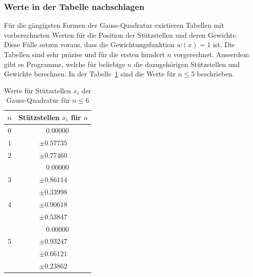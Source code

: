 \subsubsection{Werte in der Tabelle nachschlagen}
Für die gängigsten Formen der Gauss-Quadratur existieren Tabellen mit vorberechneten Werten für die
Position der Stützstellen und deren Gewichte.
Diese Fälle setzen voraus, dass die Gewichtungsfunktion $w(x) = 1$ ist. 
Die Tabellen sind sehr präzise und für die ersten hundert $n$ vorgerechnet.
Ausserdem gibt es Programme, welche für beliebige $n$ die dazugehörigen 
Stützstellen und Gewichte berechnen. 
In der Tabelle~\ref{buch:table:gaussabscissenwerte} sind die Werte für $n \leq 5$ beschrieben.
\begin{table}
    \centering
    \begin{tabular}{|c|c|}
        \hline
        $n$ & Stützstellen $x_{i}$ für $n$ \\
        \hline
        $0$ & $ \phantom{-} 0.00000 $ \\
        \hline
        $1$ & $ \pm 0.57735 $ \\
        \hline
        $2$ & $ \pm 0.77460 $ \\
            & $ \phantom{-} 0.00000 $ \\
        \hline
        $3$ & $ \pm 0.86114 $ \\
            & $ \pm 0.33998 $ \\
        \hline
        $4$ & $ \pm 0.90618 $ \\
            & $ \pm 0.53847 $ \\
            & $ \phantom{-} 0.00000 $ \\
        \hline
        $5$ & $ \pm 0.93247 $ \\
            & $ \pm 0.66121 $ \\
            & $ \pm 0.23862 $ \\
        \hline
    \end{tabular}
    \caption{Werte für Stützstellen $x_{i}$ der Gauss-Quadratur für $n \leq 6$
    \label{buch:table:gaussabscissenwerte}}    
\end{table}


